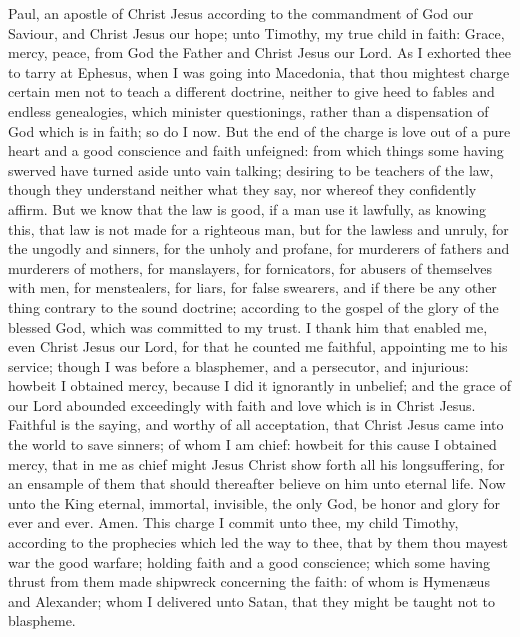 


Paul, an apostle of Christ Jesus according to the commandment of God our Saviour, and Christ Jesus our hope; unto Timothy, my true child in faith: Grace, mercy, peace, from God the Father and Christ Jesus our Lord.  As I exhorted thee to tarry at Ephesus, when I was going into Macedonia, that thou mightest charge certain men not to teach a different doctrine, neither to give heed to fables and endless genealogies, which minister questionings, rather than a dispensation of God which is in faith; so do I now. But the end of the charge is love out of a pure heart and a good conscience and faith unfeigned: from which things some having swerved have turned aside unto vain talking; desiring to be teachers of the law, though they understand neither what they say, nor whereof they confidently affirm. But we know that the law is good, if a man use it lawfully, as knowing this, that law is not made for a righteous man, but for the lawless and unruly, for the ungodly and sinners, for the unholy and profane, for murderers of fathers and murderers of mothers, for manslayers, for fornicators, for abusers of themselves with men, for menstealers, for liars, for false swearers, and if there be any other thing contrary to the sound doctrine; according to the gospel of the glory of the blessed God, which was committed to my trust.  I thank him that enabled me, even Christ Jesus our Lord, for that he counted me faithful, appointing me to his service; though I was before a blasphemer, and a persecutor, and injurious: howbeit I obtained mercy, because I did it ignorantly in unbelief; and the grace of our Lord abounded exceedingly with faith and love which is in Christ Jesus. Faithful is the saying, and worthy of all acceptation, that Christ Jesus came into the world to save sinners; of whom I am chief: howbeit for this cause I obtained mercy, that in me as chief might Jesus Christ show forth all his longsuffering, for an ensample of them that should thereafter believe on him unto eternal life. Now unto the King eternal, immortal, invisible, the only God, be honor and glory for ever and ever. Amen.  This charge I commit unto thee, my child Timothy, according to the prophecies which led the way to thee, that by them thou mayest war the good warfare; holding faith and a good conscience; which some having thrust from them made shipwreck concerning the faith: of whom is Hymenæus and Alexander; whom I delivered unto Satan, that they might be taught not to blaspheme. 

